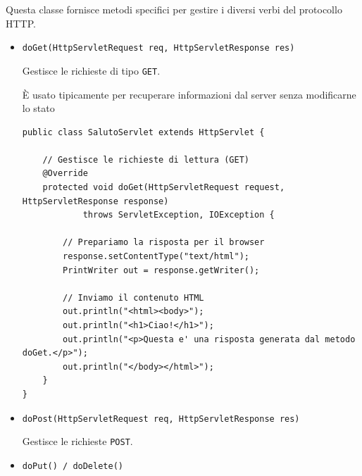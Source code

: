 Questa classe fornisce metodi specifici per gestire i diversi verbi del protocollo HTTP.
\begin{itemize}
    \item \texttt{doGet(HttpServletRequest req, HttpServletResponse res)}

    Gestisce le richieste di tipo \texttt{GET}.

    È usato tipicamente per recuperare informazioni dal server senza modificarne lo stato

    \begin{tcolorbox}[breakable, title={Esempio del metodo GET}]
        \begin{lstlisting}
public class SalutoServlet extends HttpServlet {

    // Gestisce le richieste di lettura (GET)
    @Override
    protected void doGet(HttpServletRequest request, HttpServletResponse response) 
            throws ServletException, IOException {
        
        // Prepariamo la risposta per il browser
        response.setContentType("text/html");
        PrintWriter out = response.getWriter();

        // Inviamo il contenuto HTML
        out.println("<html><body>");
        out.println("<h1>Ciao!</h1>");
        out.println("<p>Questa e' una risposta generata dal metodo doGet.</p>");
        out.println("</body></html>");
    }
}
        \end{lstlisting}
    \end{tcolorbox}
    \item \texttt{doPost(HttpServletRequest req, HttpServletResponse res)}

    Gestisce le richieste \texttt{POST}.
    \item \texttt{doPut() / doDelete()}
\end{itemize}

